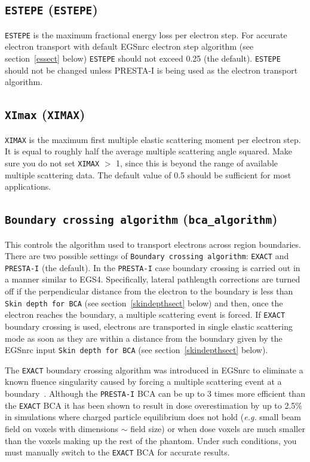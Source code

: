 \documentclass[12pt,twoside]{article}      %
\begin{document}
\subsection{{\tt ESTEPE} ({\tt ESTEPE})}
\label{estepesect}

{\tt ESTEPE} is the maximum fractional energy loss per electron step.
For accurate electron transport with default EGSnrc electron
step algorithm (see section~\ref{essect} below) {\tt ESTEPE} should
not exceed 0.25 (the default).  {\tt ESTEPE} should not be changed
unless PRESTA-I is being used as
the electron transport algorithm.

\subsection{{\tt XImax} ({\tt XIMAX})}

{\tt XIMAX} is the maximum first multiple elastic scattering moment per electron
step.  It is equal to roughly half the average multiple scattering angle
squared.  Make sure you do not set {\tt XIMAX} $>$ 1,
since this is beyond the range of available multiple scattering data.
The default value of 0.5 should be sufficient for most applications.

\subsection{{\tt Boundary crossing algorithm} ({\tt bca\_algorithm})}
\label{bcasect}

This controls the algorithm used to transport electrons across region
boundaries.  There are two possible settings of
{\tt Boundary crossing algorithm}: {\tt EXACT} and
{\tt PRESTA-I} (the default).  In the {\tt PRESTA-I} case boundary
crossing is carried out in a manner similar to EGS4.  Specifically, lateral
pathlength corrections are turned off if the perpendicular distance
from the electron to the boundary is less than
{\tt Skin depth for BCA} (see
section~\ref{skindepthsect} below) and then, once the electron reaches
the boundary, a multiple scattering event is forced.
If {\tt EXACT} boundary crossing is used, electrons are
transported in
single elastic scattering mode as soon as they are within a distance from
the boundary given by the EGSnrc input {\tt Skin depth for BCA} (see
section~\ref{skindepthsect} below).

The {\tt EXACT} boundary
crossing algorithm was introduced in EGSnrc to eliminate a
known fluence singularity caused by forcing a
multiple scattering event at a boundary~\cite{FS95}.  Although
the {\tt PRESTA-I} BCA can be up to 3 times more efficient than
the {\tt EXACT} BCA it has been shown to result in dose overestimation
by up to 2.5\% in simulations where charged particle equilibrium does not
hold ({\em e.g.} small beam field on voxels with dimensions $\sim$ field
size) or when dose voxels are much smaller than the voxels making up the
rest of the phantom\cite{KW06}.  Under such conditions, you must
manually switch to the {\tt EXACT} BCA for accurate results.
\end{document}
